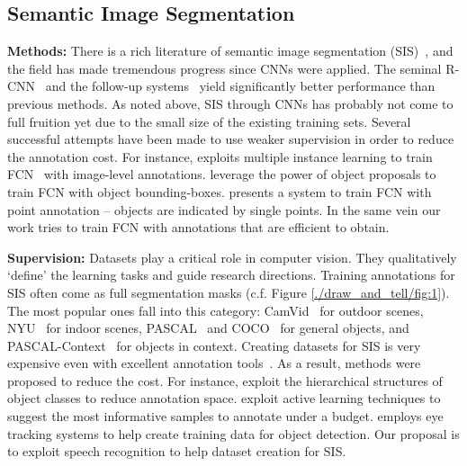\subsection{Semantic Image Segmentation}
\textbf{Methods:} There is a rich literature of semantic image
segmentation (SIS)~\citep{texton:boost, fully-crf}, and the field has
made tremendous progress since CNNs were applied. The seminal
R-CNN~\citep{rcnn} and the follow-up systems~\citep{Long_2015_CVPR,
  rcnn_crf, crfasrnn} yield significantly better performance than
previous methods. As noted above, SIS through CNNs has probably not come
to full fruition yet due to the small size of the existing training
sets. Several successful attempts have been made to use weaker
supervision in order to reduce the annotation cost.  For instance,
\citep{cnn:mil} exploits multiple instance learning to train
FCN~\citep{Long_2015_CVPR} with image-level annotations. \citep{cnn:em,
  BoxSup, ConsCNN} leverage the power of object proposals to train FCN
with object bounding-boxes. \citep{whatpoint} presents a system to
train FCN with point annotation -- objects are indicated by single
points.  In the same vein our work tries to train FCN with annotations
that are efficient to obtain. 

\noindent
\textbf{Supervision:} Datasets play a critical role in computer
vision. They qualitatively `define' the learning tasks and guide
research directions.
Training annotations for SIS often come as full segmentation masks
(c.f. Figure \ref{./draw_and_tell/fig:1}). The most popular ones fall into this
category: CamVid~\citep{camvid:data} for outdoor scenes,
NYU~\citep{NYU} for indoor scenes, PASCAL~\citep{pascal:2011} and
COCO~\citep{coco:eccv} for general objects, and
PASCAL-Context~\citep{pascal:context} for objects in context.  Creating
datasets for SIS is very expensive even with excellent annotation
tools~\citep{open:surface, label:me}. As a result, methods were
proposed to reduce the cost.  For instance, \citep{scalable:annotation,
  coco:eccv} exploit the hierarchical structures of object classes to
reduce annotation space. \citep{AFrameSel, expected:loss} exploit
active learning techniques to suggest the most informative samples to
annotate under a budget. \citep{detect:eyetr} employs eye tracking
systems to help create training data for object detection.  Our
proposal is to exploit speech recognition to help dataset creation for
SIS.

